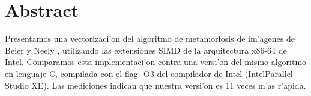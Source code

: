 \section{Abstract}

Presentamos una vectorizaci'on del algoritmo de metamorfosis de im'agenes de Beier y Neely \cite{beier92}, utilizando las extensiones SIMD de la arquitectura x86-64 de Intel. Comparamos esta implementaci'on contra una versi'on del mismo algoritmo en lenguaje C, compilada con el flag -O3 del compilador de Intel (Intel\textregistered Parallel Studio XE). Las mediciones indican que nuestra versi'on es 11 veces m'as r'apida.